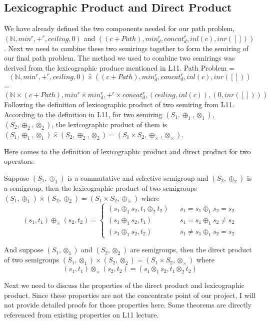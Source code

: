 \documentclass[a4paper,12pt,twoside,openright]{report}
\begin{document}
\subsection{Lexicographic Product and Direct Product}
We have already defined the two components needed for our path problem, $(\mathbb{N},min^r,+^r,ceiling,0)$ and $((c + Path),min^r_d,concat^r_d,inl(c),inr([]))$. 
Next we need to combine these two semirings together to form the semiring of our final path problem. The method we used to combine two semirings was derived from the lexicographic produce mentioned in L11. Path Problem =
\[(\mathbb{N},min^r,+^r,ceiling,0) \bar{\times} ((c + Path),min^r_d,concat^r_d,inl(c),inr([]))\]
=
\[(\mathbb{N} \times (c + Path), min^r \bar{\times} min^r_d, +^r \times concat^r_d, (ceiling,inl(c)), (0,inr([])))\]
Following the definition of lexicographic product of two semiring from L11.
According to the definition in L11, for two semiring $(S_1,\oplus_1,\otimes_1)$,$(S_2,\oplus_2,\otimes_2)$, the lexicographic product of them is $(S_1,\oplus_1,\otimes_1) \bar{\times} (S_2,\oplus_2,\otimes_2) = (S_1\times S_2, \oplus_{\bar{\times}}, \otimes_\times)$.

Here comes to the definition of lexicographic product and direct product for two operators. 

Suppose $(S_1,\oplus_1)$ is a commutative and selective semigroup and $(S_2,\oplus_2)$ is a semigroup, then the lexicographic product of two semigroups $(S_1,\oplus_1) \bar{\times} (S_2,\oplus_2) = (S_1\times S_2, \oplus_{\bar{\times}})$ where
\[(s_1,t_1) \oplus_{\bar{\times}} (s_2,t_2)=\left\{
\begin{array}{rcl}
(s_1\oplus_1 s_2,t_1\oplus_2 t_2)      &      & { s_1 = s_1 \oplus_1 s_2 = s_2}\\
(s_1\oplus_1 s_2,t_1)       &      & {s_1 = s_1 \oplus_1 s_2 \neq s_2}\\
(s_1\oplus_1 s_2,t_2)       &      & {s_1 \neq s_1 \oplus_1 s_2 = s_2}
\end{array} \right.\]

And suppose $(S_1,\otimes_1)$ and $(S_2,\otimes_2)$ are semigroups, then the direct product of two semigroups $(S_1,\otimes_1) \times (S_2,\otimes_2) = (S_1\times S_2, \otimes_\times)$ where
\[(s_1,t_1) \otimes_\times (s_2,t_2)= (s_1 \otimes_1 s_2, t_1\otimes_2 t_2)\]

Next we need to discuss the properties of the direct product and lexicographic product. Since these properties are not the concentrate point of our project, I will not provide detailed proofs for those properties here. Some theorems are directly referenced from existing properties on L11 lecture.
\end{document}
